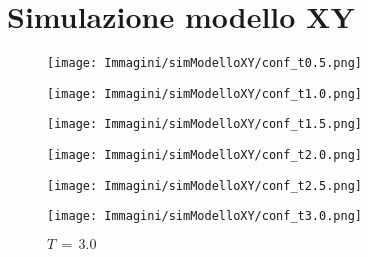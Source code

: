 \section{Simulazione modello XY}

\vspace*{\fill}

\begin{figure}[H]
    \centering
    \begin{minipage}{0.45\textwidth}  
      \centering
      \texttt{[image: Immagini/simModelloXY/conf\_t0.5.png]}
      \caption{$T\,=\,0.5$}
    \end{minipage}\hfill
    \begin{minipage}{0.45\textwidth}  
      \centering
      \texttt{[image: Immagini/simModelloXY/conf\_t1.0.png]}
      \caption{$T\,=\,1.0$}
    \end{minipage}
    \vspace{12pt}

    \begin{minipage}{0.45\textwidth}  
        \centering
        \texttt{[image: Immagini/simModelloXY/conf\_t1.5.png]}
        \caption{$T\,=\,1.5$}
      \end{minipage}\hfill
      \begin{minipage}{0.45\textwidth}  
        \centering
        \texttt{[image: Immagini/simModelloXY/conf\_t2.0.png]}
        \caption{$T\,=\,2.0$}
    \end{minipage}
    \vspace{12pt}
  
    \begin{minipage}{0.45\textwidth}  
      \centering
      \texttt{[image: Immagini/simModelloXY/conf\_t2.5.png]}
      \caption{$T\,=\,2.5$}
    \end{minipage}\hfill
    \begin{minipage}{0.45\textwidth}  
      \centering
      \texttt{[image: Immagini/simModelloXY/conf\_t3.0.png]}
      \caption{$T\,=\,3.0$}
    \end{minipage}
    
\end{figure}

\vspace*{\fill}

\vspace*{\fill}

